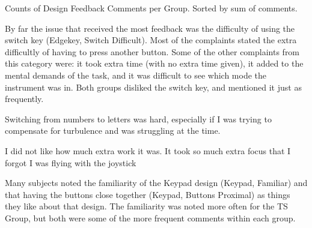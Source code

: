 \begin{table}
    \centering
    \caption{Counts of Design Feedback Comments per Group. Sorted by sum of comments.}
    \label{tab:de_feedback_sorted}
\end{table}

By far the issue that received the most feedback was the difficulty of using the switch key (Edgekey, Switch Difficult).
Most of the complaints stated the extra difficultly of having to press another button.
Some of the other complaints from this category were: it took extra time (with no extra time given), it added to the mental demands of the task, and it was difficult to see which mode the instrument was in.
Both groups disliked the switch key, and mentioned it just as frequently.
\begin{displayquote}[TS Subject]
    Switching from numbers to letters was hard, especially if I was trying to compensate for turbulence and was struggling at the time.
\end{displayquote}
\begin{displayquote}[VR Subject]
    I did not like how much extra work it was. It took so much extra focus that I forgot I was flying with the joystick
\end{displayquote}

Many subjects noted the familiarity of the Keypad design (Keypad, Familiar) and that having the buttons close together (Keypad, Buttons Proximal) as things they like about that design.
The familiarity was noted more often for the TS Group, but both were some of the more frequent comments within each group.

